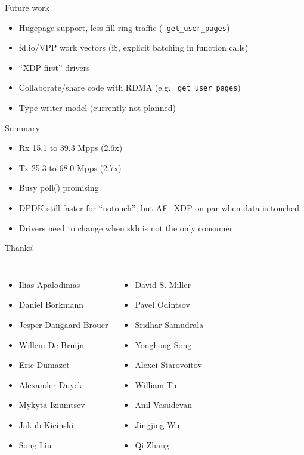 \documentclass[aspectratio=169]{beamer}
\begin{document}
  \begin{frame}{Future work}
    \begin{itemize}
    \item Hugepage support, less fill ring traffic ({\tt
      get\_user\_pages})
    \item fd.io/VPP work vectors (i\$, explicit batching in function calls)
    \item ``XDP first'' drivers 
    \item Collaborate/share code with RDMA (e.g. {\tt
      get\_user\_pages})
    \item Type-writer model (currently not planned)
    \end{itemize}
  \end{frame}

  \begin{frame}{Summary}
  \begin{itemize}
  \item Rx 15.1 to 39.3 Mpps (2.6x)
  \item Tx 25.3 to 68.0 Mpps (2.7x)
  \item Busy poll() promising
  \item DPDK still faster for ``notouch'', but AF\_XDP on par when data is touched
  \item Drivers need to change when skb is not the only consumer
  \end{itemize}
  \end{frame}

  \begin{frame}{Thanks!}
  \begin{columns}[T,onlytextwidth]
    \begin{itemize}
    \item Ilias Apalodimas
    \item Daniel Borkmann
    \item Jesper Dangaard Brouer
    \item Willem De Bruijn
    \item Eric Dumazet
    \item Alexander Duyck
    \item Mykyta Iziumtsev
    \item Jakub Kicinski
    \item Song Liu
    \end{itemize}
    
    \begin{itemize}
    \item David S. Miller
    \item Pavel Odintsov
    \item Sridhar Samudrala
    \item Yonghong Song
    \item Alexei Starovoitov
    \item William Tu
    \item Anil Vasudevan
    \item Jingjing Wu
    \item Qi Zhang
    \end{itemize}
  \end{columns}
  \end{frame}
\end{document}
